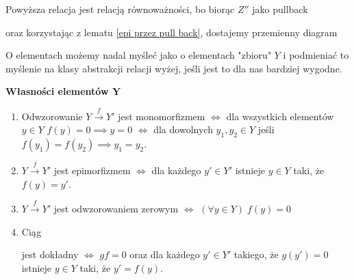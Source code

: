 Powyższa relacja jest relacją równoważności, bo biorąc $Z''$ jako pullback 
\begin{center}\end{center}
oraz korzystając z lematu \ref{epi przez pull back}, dostajemy przemienny diagram

\begin{center}\end{center}

O elementach możemy nadal myśleć jako o elementach "zbioru" $Y$ i podmieniać to myślenie na klasy abstrakcji relacji wyżej, jeśli jest to dla nas bardziej wygodne.

{\large\bfseries\color{green}Własności elementów $\mathbf{Y}$}

\begin{enumerate}
  \item Odwzorowanie $Y\xrightarrow{f}Y'$ jest monomorfizmem $\iff$ dla wszystkich elementów $y\in Y$ $f(y)=0\implies y=0$ $\iff$ dla dowolnych $y_1,y_2\in Y$ jeśli $f(y_1)=f(y_2)\implies y_1=y_2$.
  \item $Y\xrightarrow{f}Y'$ jest epimorfizmem $\iff$ dla każdego $y'\in Y'$ istnieje $y\in Y$ taki, że $f(y)=y'$.
  \item $Y\xrightarrow{f}Y'$ jest odwzorowaniem zerowym $\iff$ $(\forall y\in Y)\;f(y)=0$
  \item Ciąg  jest dokładny $\iff$ $gf=0$ oraz dla każdego $y'\in Y'$ takiego, że $g(y')=0$ istnieje $y\in Y$ taki, że $y'=f(y)$.
\end{enumerate}


